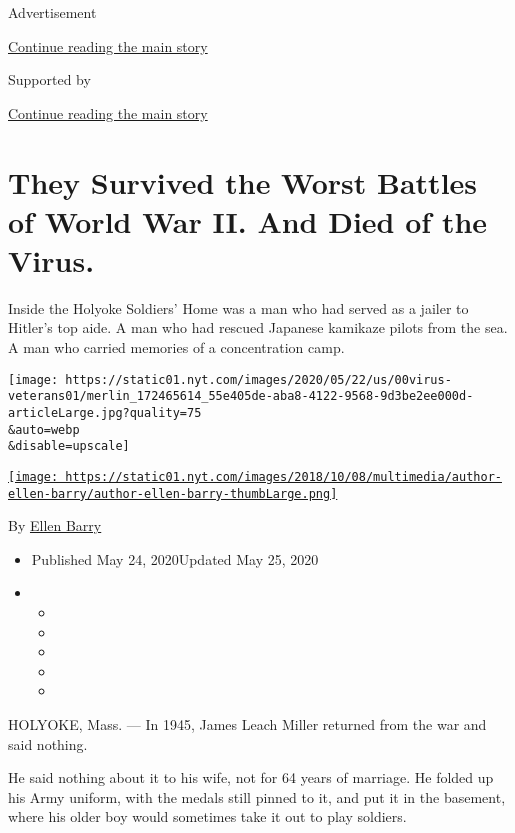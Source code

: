 Advertisement

\protect\hyperlink{after-top}{Continue reading the main story}

Supported by

\protect\hyperlink{after-sponsor}{Continue reading the main story}

\hypertarget{they-survived-the-worst-battles-of-world-war-ii-and-died-of-the-virus}{%
\section{They Survived the Worst Battles of World War II. And Died of
the
Virus.}\label{they-survived-the-worst-battles-of-world-war-ii-and-died-of-the-virus}}

Inside the Holyoke Soldiers' Home was a man who had served as a jailer
to Hitler's top aide. A man who had rescued Japanese kamikaze pilots
from the sea. A man who carried memories of a concentration camp.

\texttt{[image: https://static01.nyt.com/images/2020/05/22/us/00virus-veterans01/merlin\_172465614\_55e405de-aba8-4122-9568-9d3be2ee000d-articleLarge.jpg?quality=75\\\&auto=webp\\\&disable=upscale]}

\href{https://www.nytimes.com/by/ellen-barry}{\texttt{[image: https://static01.nyt.com/images/2018/10/08/multimedia/author-ellen-barry/author-ellen-barry-thumbLarge.png]}}

By \href{https://www.nytimes.com/by/ellen-barry}{Ellen Barry}

\begin{itemize}
\item
  Published May 24, 2020Updated May 25, 2020
\item
  \begin{itemize}
  \item
  \item
  \item
  \item
  \item
  \end{itemize}
\end{itemize}

HOLYOKE, Mass. --- In 1945, James Leach Miller returned from the war and
said nothing.

He said nothing about it to his wife, not for 64 years of marriage. He
folded up his Army uniform, with the medals still pinned to it, and put
it in the basement, where his older boy would sometimes take it out to
play soldiers.

